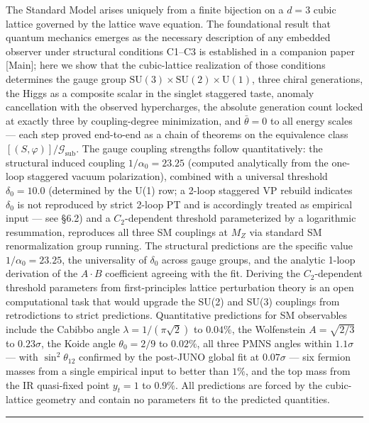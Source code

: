 \documentclass[
]{article}
\begin{document}
The Standard Model arises uniquely from a finite bijection on a
\(d = 3\) cubic lattice governed by the lattice wave equation. The
foundational result that quantum mechanics emerges as the necessary
description of any embedded observer under structural conditions C1--C3
is established in a companion paper {[}Main{]}; here we show that the
cubic-lattice realization of those conditions determines the gauge group
\(\mathrm{SU}(3) \times \mathrm{SU}(2) \times \mathrm{U}(1)\), three
chiral generations, the Higgs as a composite scalar in the singlet
staggered taste, anomaly cancellation with the observed hypercharges,
the absolute generation count locked at exactly three by coupling-degree
minimization, and \(\bar\theta = 0\) to all energy scales --- each step
proved end-to-end as a chain of theorems on the equivalence class
\([(S, \varphi)]/\mathcal{G}_{\text{sub}}\). The gauge coupling
strengths follow quantitatively: the structural induced coupling
\(1/\alpha_0 = 23.25\) (computed analytically from the one-loop
staggered vacuum polarization), combined with a universal threshold
\(\delta_0 = 10.0\) (determined by the U(1) row; a 2-loop staggered VP
rebuild indicates \(\delta_0\) is not reproduced by strict 2-loop PT and
is accordingly treated as empirical input --- see §6.2) and a
\(C_2\)-dependent threshold parameterized by a logarithmic resummation,
reproduces all three SM couplings at \(M_Z\) via standard SM
renormalization group running. The structural predictions are the
specific value \(1/\alpha_0 = 23.25\), the universality of \(\delta_0\)
across gauge groups, and the analytic 1-loop derivation of the
\(A \cdot B\) coefficient agreeing with the fit. Deriving the
\(C_2\)-dependent threshold parameters from first-principles lattice
perturbation theory is an open computational task that would upgrade the
SU(2) and SU(3) couplings from retrodictions to strict predictions.
Quantitative predictions for SM observables include the Cabibbo angle
\(\lambda = 1/(\pi\sqrt{2})\) to \(0.04\%\), the Wolfenstein
\(A = \sqrt{2/3}\) to \(0.23\sigma\), the Koide angle \(\theta_0 = 2/9\)
to \(0.02\%\), all three PMNS angles within \(1.1\sigma\) --- with
\(\sin^2\theta_{12}\) confirmed by the post-JUNO global fit at
\(0.07\sigma\) --- six fermion masses from a single empirical input to
better than \(1\%\), and the top mass from the IR quasi-fixed point
\(y_t = 1\) to \(0.9\%\). All predictions are forced by the
cubic-lattice geometry and contain no parameters fit to the predicted
quantities.

\begin{center}\rule{0.5\linewidth}{0.5pt}\end{center}
\end{document}
